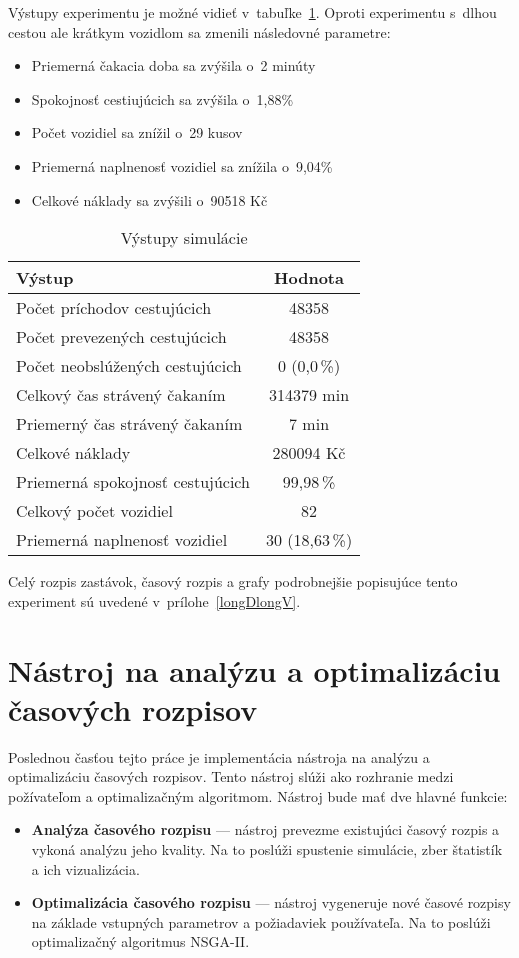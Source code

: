 Výstupy experimentu je možné vidieť v~tabuľke~\ref{tab:longDlongVout}.
Oproti experimentu s~dlhou cestou ale krátkym vozidlom sa zmenili následovné parametre:
\begin{itemize}
  \item Priemerná čakacia doba sa zvýšila o~2 minúty
  \item Spokojnosť cestiujúcich sa zvýšila o~1,88\%
  \item Počet vozidiel sa znížil o~29 kusov
  \item Priemerná naplnenosť vozidiel sa znížila o~9,04\%
  \item Celkové náklady sa zvýšili o~90518 Kč
\end{itemize}

\begin{table}[h]
  \centering
  \begin{tabular}{|l|c|}
    \hline
      \textbf{Výstup} & \textbf{Hodnota} \\ \hline
        Počet príchodov cestujúcich & 48358 \\ \hline
          Počet prevezených cestujúcich & 48358 \\ \hline
          Počet neobslúžených cestujúcich & 0 (0,0\,\%) \\ \hline
          Celkový čas strávený čakaním & 314379 min \\ \hline
          Priemerný čas strávený čakaním & 7 min \\ \hline
          Celkové náklady & 280094 Kč \\ \hline
          Priemerná spokojnosť cestujúcich & 99,98\,\% \\ \hline
          Celkový počet vozidiel & 82 \\ \hline
          Priemerná naplnenosť vozidiel & 30 (18,63\,\%) \\ \hline
  \end{tabular}
  \caption{Výstupy simulácie}
  \label{tab:longDlongVout}
\end{table}

Celý rozpis zastávok, časový rozpis a grafy podrobnejšie popisujúce tento experiment sú uvedené v~prílohe~\ref{longDlongV}.

\chapter{Nástroj na analýzu a optimalizáciu časových rozpisov}\label{nastroj}

Poslednou časťou tejto práce je implementácia nástroja na analýzu a optimalizáciu časových rozpisov.
Tento nástroj slúži ako rozhranie medzi požívateľom a optimalizačným algoritmom.
Nástroj bude mať dve hlavné funkcie:
\begin{itemize}
  \item \textbf{Analýza časového rozpisu} --- nástroj prevezme existujúci časový rozpis a vykoná analýzu jeho kvality. Na to poslúži spustenie simulácie, zber štatistík a ich vizualizácia.
  \item \textbf{Optimalizácia časového rozpisu} --- nástroj vygeneruje nové časové rozpisy na základe vstupných parametrov a požiadaviek používateľa. Na to poslúži optimalizačný algoritmus NSGA-II.
\end{itemize}

